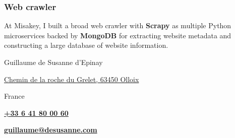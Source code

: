 \documentclass[withoutsidebar, hidelinks]{simplehipstercv}
\newlength{\rightcolwidth}
\begin{document}
\begin{paracol}{2}
\begin{minipage}[t]{0.45\rightcolwidth}
    \subsubsection*{Web crawler}
    At Misakey, I built a broad web crawler with \textbf{Scrapy} as multiple Python microservices backed by \textbf{MongoDB} for extracting website metadata and constructing a large database of website information.
  \end{minipage}


  \vfill{} %

  \setlength{\parindent}{0pt}
  \begin{minipage}[t]{0.9\rightcolwidth}
    \begin{center}\fontfamily{\sfdefault}\selectfont \color{black!70}
      {
        \small Guillaume de Susanne d'Epinay

        \href{geo:45.6214539,3.0495612}{ Chemin de la roche du Grelet, 63450 Olloix}

         France


        \href{tel:+33 6 41 80 00 60}{ \textbf{+33 6 41 80 00 60}}

        \href{mailto:guillaume@desusanne.com}{ \textbf{guillaume@desusanne.com}}

      }
    \end{center}
  \end{minipage}

\end{paracol}
\end{document}
